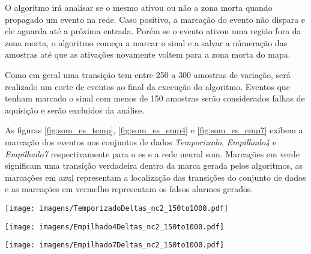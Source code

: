 O algoritmo irá analisar se o mesmo ativou ou não a zona morta quando
propagado um evento na rede. Caso positivo, a marcação do evento não
dispara e ele aguarda até a próxima entrada. Porém se o evento ativou
uma região fora da zona morta, o algoritmo começa a marcar o sinal e a
salvar a númeração das amostras até que as ativações novamente voltem
para a zona morta do mapa.
	
Como em geral uma transição tem entre 250 a 300 amostras de variação,
será realizado um corte de eventos ao final da execução do algoritmo.
Eventos que tenham marcado o sinal com menos de 150 amostras serão
considerados falhas de aquisição e serão excluidos da análise.	

As figuras \ref{fig:som_es_temp}, \ref{fig:som_es_emp4} e
\ref{fig:som_es_emp7} exibem a marcação dos eventos nos conjuntos
de dados \emph{Temporizado}, \emph{Empilhado4} e \emph{Empilhado7}
respectivamente para o \acs{es} e a rede neural \acs{som}.
Marcações em verde significam uma transição verdadeira dentro da marca
gerada pelos algoritmos, as marcações em azul representam a
localização das transições do conjunto de dados e as marcações em
vermelho representam os falsos alarmes gerados.

	
\begin{sidewaysfigure}[p]
\centering
\texttt{[image: imagens/TemporizadoDeltas\_nc2\_150to1000.pdf]}
\caption{Marcação das transições para o algoritmo genético e a rede
neural SOM pare os dados do \emph{Temporizado}. Linhas em verde significam
verdadeiro positivo,as vermelhas o falso alarme e as azuls a verdade.}
\label{fig:som_es_temp}
\end{sidewaysfigure}

\begin{sidewaysfigure}[p]
\centering
\texttt{[image: imagens/Empilhado4Deltas\_nc2\_150to1000.pdf]}
\caption{Marcação das transições para o algoritmo genético e a rede
neural SOM para os dados do \emph{Empilhado4}. Linhas em verde significam
verdadeiro positivo,as vermelhas o falso alarme e as azuls a verdade.}
\label{fig:som_es_emp4}
\end{sidewaysfigure}

\begin{sidewaysfigure}[p]
\centering
\texttt{[image: imagens/Empilhado7Deltas\_nc2\_150to1000.pdf]}
\caption{Marcação das transições para o algoritmo genético e a rede
neural SOM para os dados do \emph{Empilhado7}. Linhas em verde significam
verdadeiro positivo,as vermelhas o falso alarme e as azuls a verdade.}
\label{fig:som_es_emp7}
\end{sidewaysfigure}
	
